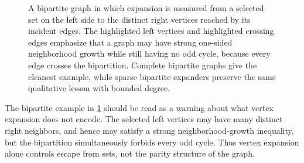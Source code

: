 \begin{figure}[t]
	\centering
	\begin{mdframed}[linewidth=0.4pt, linecolor=expanderMutedColor!45, backgroundcolor=white, roundcorner=2pt, innerleftmargin=6pt, innerrightmargin=6pt, innertopmargin=6pt, innerbottommargin=6pt]
		\centering
	\end{mdframed}
	\caption{A bipartite graph in which expansion is measured from a selected set on the left side to the distinct right vertices reached by its incident edges. The highlighted left vertices and highlighted crossing edges emphasize that a graph may have strong one-sided neighborhood growth while still having no odd cycle, because every edge crosses the bipartition. Complete bipartite graphs give the cleanest example, while sparse bipartite expanders preserve the same qualitative lesson with bounded degree.}
	\label{fig:bipartite-expander-example}
\end{figure}

The bipartite example in \cref{fig:bipartite-expander-example} should be read as a warning about what vertex expansion does not encode. The selected left vertices may have many distinct right neighbors, and hence may satisfy a strong neighborhood-growth inequality, but the bipartition simultaneously forbids every odd cycle. Thus vertex expansion alone controls escape from sets, not the parity structure of the graph.

